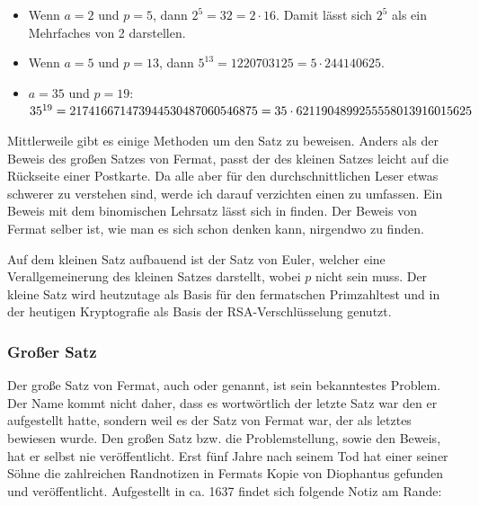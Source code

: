 \begin{itemize}
    \item Wenn $a=2$ und $p=5$, dann $2^{5} = 32 = 2 \cdot 16$. Damit lässt sich $2^{5}$ als ein Mehrfaches von 2 darstellen.
    \item Wenn $a=5$ und $p=13$, dann $5^{13} = 1220703125 = 5 \cdot 244140625$.
    \item $a=35$ und $p=19$: \quad $35^{19} = 217416671473944530487060546875 \\ = 35 \cdot 6211904899255558013916015625$
\end{itemize}

Mittlerweile gibt es einige Methoden um den Satz zu beweisen. Anders als der Beweis des großen Satzes von Fermat, passt der des kleinen Satzes leicht auf die Rückseite einer Postkarte. Da alle aber für den durchschnittlichen Leser etwas schwerer zu verstehen sind, werde ich darauf verzichten einen zu umfassen. Ein Beweis mit dem binomischen Lehrsatz lässt sich in \cite{wolframFlT} finden. Der Beweis von Fermat selber ist, wie man es sich schon denken kann, nirgendwo zu finden.

Auf dem kleinen Satz aufbauend ist der Satz von Euler, welcher eine Verallgemeinerung des kleinen Satzes darstellt, wobei $p$ nicht  sein muss. Der kleine Satz wird heutzutage als Basis für den fermatschen Primzahltest und in der heutigen Kryptografie als Basis der RSA-Verschlüsselung genutzt.

\subsubsection{Großer Satz} \label{sec:grSatz}
Der große Satz von Fermat, auch  oder  genannt, ist sein bekanntestes Problem. Der Name  kommt nicht daher, dass es wortwörtlich der letzte Satz war den er aufgestellt hatte, sondern weil es der Satz von Fermat war, der als letztes bewiesen wurde. Den großen Satz bzw. die Problemstellung, sowie den Beweis, hat er selbst nie veröffentlicht. Erst fünf Jahre nach seinem Tod hat einer seiner Söhne die zahlreichen Randnotizen in Fermats Kopie von Diophantus  gefunden und veröffentlicht. Aufgestellt in ca. 1637 findet sich folgende Notiz am Rande:

\begin{quote}
    \textit{}
\end{quote}


